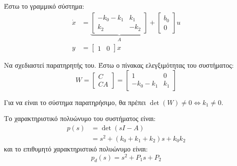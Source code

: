 \documentclass[11pt,a4paper,notitlepage,fleqn]{article}
\begin{document}
\begin{exercise}
	Έστω το γραμμικό σύστημα:
	\begin{align*}
		\dot x &= \underbrace{\left[\begin{matrix}
		-k_0 - k_1 & k_1 \\ k_2 & -k_2
		\end{matrix}\right]}_{A} + \left[\begin{matrix}
	b_0 \\ 0
	\end{matrix}\right]u\\
	y &= \left[\begin{matrix}
	1 & 0
	\end{matrix}\right]x
	\end{align*}
	
	Να σχεδιαστεί παρατηρητής του.
	\tcblower
	Έστω ο πίνακας ελεγξιμότητας του συστήματος:
	\[
	W = \left[\begin{matrix}
	C \\ CA
	\end{matrix}\right] = \left[\begin{matrix}
	1 & 0 \\ -k_0-k_1 & k_1
	\end{matrix}\right]
	\]
	
	Για να είναι το σύστημα παρατηρήσιμο, θα πρέπει \( \det(W) \neq 0 \iff k_1 \neq 0 \).
	
	Το χαρακτηριστικό πολυώνυμο του συστήματος είναι:
	\begin{align*}
		p(s) &= \det(sI-A) \\&=
		s^2 + (k_0+k_1+k_2)s + k_0k_2
	\end{align*}
	και το επιθυμητό χαρακτηριστικό πολυώνυμο είναι:
	\[
	p_d(s) = s^2 + P_1 s + P_2
	\]
	

\end{exercise}
\end{document}
